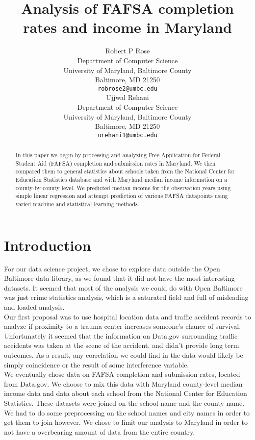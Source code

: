 \documentclass[12pt]{article}
\title{Analysis of FAFSA completion rates and income in Maryland}
\author{
  Robert P Rose \\
  Department of Computer Science\\
  University of Maryland, Baltimore County\\
  Baltimore, MD 21250 \\
  \texttt{robrose2@umbc.edu} \\
   \And
  Ujjwal Rehani \\
  Department of Computer Science\\
  University of Maryland, Baltimore County\\
  Baltimore, MD 21250 \\
  \texttt{urehani1@umbc.edu} \\
}
\begin{document}
\maketitle

\begin{abstract}
In this paper we begin by processing and analyzing Free Application for Federal
Student Aid (FAFSA) completion and submission rates in Maryland. We then compared them to 
general statistics about schools taken from the National Center for Education 
Statistics database and with Maryland median income information on a 
county-by-county level. We predicted median income for the observation years using 
simple linear regression and attempt prediction of various FAFSA datapoints using 
varied machine and statistical learning methods. \\
\end{abstract}

\section{Introduction}
For our data science project, we chose to explore data outside the Open Baltimore
data library, as we found that it did not have the most interesting datasets. It
seemed that most of the analysis we could do with Open Baltimore was just crime
statistics analysis, which is a saturated field and full of misleading and 
loaded analysis.\cite{weatherburn2011} \\

Our first proposal was to use hospital location data and traffic accident records
to analyze if proximity to a trauma center increases someone's chance of survival.
Unfortunately it seemed that the information on Data.gov surrounding traffic
accidents was taken at the scene of the accident, and didn't provide long term
outcomes. As a result, any correlation we could find in the data would likely be
simply coincidence or the result of some interference variable. \\

We eventually chose data on FAFSA completion and submission rates, located from
Data.gov.\cite{fafsa2019} We choose to mix this data with Maryland county-level
median income  data and data about each school from the National Center for 
Education Statistics.\cite{nces2019} These datasets were joined on the school 
name and the county name. We had to do some preprocessing on the school names
and city names in order to get them to join however. We chose to limit our 
analysis to Maryland in order to not have a overbearing amount of data from the 
entire country. \\
\end{document}
